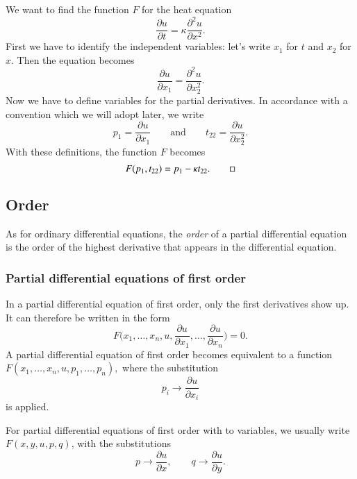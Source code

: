 \begin{beispiel}
We want to find the function $F$ for the heat equation
\[
\frac{\partial u}{\partial t}=\kappa\frac{\partial^2 u}{\partial x^2}.
\]
First we have to identify the independent variables: let's write 
$x_1$ for $t$ and $x_2$ for $x$.
Then the equation becomes
\[
\frac{\partial u}{\partial x_1}
=
\frac{\partial^2u}{\partial x_2^2}.
\]
Now we have to define variables for the partial derivatives.
In accordance with a convention which we will adopt later, we write
\[
p_1 = \frac{\partial u}{\partial x_1}
\qquad\text{and}\qquad
t_{22} = \frac{\partial u}{\partial x_2^2}.
\]
With these definitions, the function $F$ becomes
\[
F(p_1, t_{22})= p_1 - \kappa t_{22}.
\qedhere
\]
\end{beispiel}

\subsection{Order\label{klassifikation:ordnung}}
As for ordinary differential equations, the {\em order} of a partial
differential equation is the order of the
highest derivative that appears in the differential equation.

\subsubsection{Partial differential equations of first order}
In a partial differential equation of first order, only the first derivatives
show up.
It can therefore be written in the form
\[
F\biggl(x_1,\dots,x_n, u, \frac{\partial u}{\partial x_1},\dots,\frac{\partial u}{\partial x_n}\biggr)=0.
\]
A partial differential equation of first order becomes equivalent to
a function
$F(x_1,\dots,x_n,u,p_1,\dots,p_n),$
where the substitution
\[
p_i\to \frac{\partial u}{\partial x_i}
\]
is applied.

For partial differential equations of first order with to variables,
we usually write
$F(x,y,u,p,q)$,
with the substitutions
\[
p\to\frac{\partial u}{\partial x},
\qquad
q\to\frac{\partial u}{\partial y}.
\]

